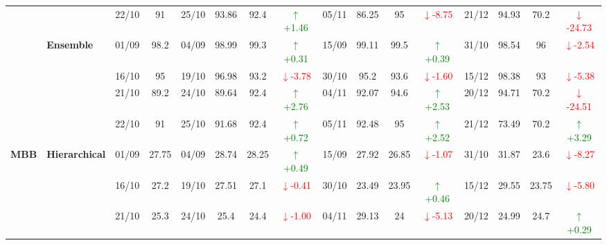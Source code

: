 \documentclass{ieeeaccess}
\begin{document}
{\begin{longtable}{llcc|cccc|cccc|cccc}
&
& 22/10 & 91 & 25/10 & 93.86 & 92.4 & \textcolor{green}{\(\uparrow\)+1.46} & 05/11 & 86.25 & 95 & \textcolor{red}{\(\downarrow\)-8.75} & 21/12 & 94.93 & 70.2 & \textcolor{red}{\(\downarrow\)-24.73} \\
\cmidrule(lr){2-16}


& \textbf{Ensemble}
& 01/09 & 98.2 & 04/09 & 98.99 & 99.3 & \textcolor{green}{\(\uparrow\)+0.31} & 15/09 & 99.11 & 99.5 & \textcolor{green}{\(\uparrow\)+0.39} & 31/10 & 98.54 & 96 & \textcolor{red}{\(\downarrow\)-2.54} \\

&
& 16/10 & 95 & 19/10 & 96.98 & 93.2 & \textcolor{red}{\(\downarrow\)-3.78} & 30/10 & 95.2 & 93.6 & \textcolor{red}{\(\downarrow\)-1.60} & 15/12 & 98.38 & 93 & \textcolor{red}{\(\downarrow\)-5.38} \\

&
& 21/10 & 89.2 & 24/10 & 89.64 & 92.4 & \textcolor{green}{\(\uparrow\)+2.76} & 04/11 & 92.07 & 94.6 & \textcolor{green}{\(\uparrow\)+2.53} & 20/12 & 94.71 & 70.2 & \textcolor{red}{\(\downarrow\)-24.51} \\

&
& 22/10 & 91 & 25/10 & 91.68 & 92.4 & \textcolor{green}{\(\uparrow\)+0.72} & 05/11 & 92.48 & 95 & \textcolor{green}{\(\uparrow\)+2.52} & 21/12 & 73.49 & 70.2 & \textcolor{green}{\(\uparrow\)+3.29} \\
\midrule



\multirow{12}{*}{\textbf{MBB}} 
& \textbf{Hierarchical}
& 01/09 & 27.75 & 04/09 & 28.74 & 28.25 & \textcolor{green}{\(\uparrow\)+0.49} & 15/09 & 27.92 & 26.85 & \textcolor{red}{\(\downarrow\)-1.07} & 31/10 & 31.87 & 23.6 & \textcolor{red}{\(\downarrow\)-8.27} \\

&
& 16/10 & 27.2 & 19/10 & 27.51 & 27.1 & \textcolor{red}{\(\downarrow\)-0.41} & 30/10 & 23.49 & 23.95 & \textcolor{green}{\(\uparrow\)+0.46} & 15/12 & 29.55 & 23.75 & \textcolor{red}{\(\downarrow\)-5.80} \\

&
& 21/10 & 25.3 & 24/10 & 25.4 & 24.4 & \textcolor{red}{\(\downarrow\)-1.00} & 04/11 & 29.13 & 24 & \textcolor{red}{\(\downarrow\)-5.13} & 20/12 & 24.99 & 24.7 & \textcolor{green}{\(\uparrow\)+0.29} \\


\end{longtable}}
\end{document}
